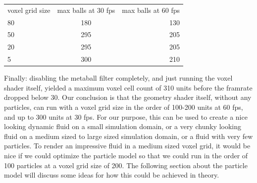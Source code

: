 \documentclass{article}
\begin{document}
\begin{multicols}{2}
        \begin{tabular}{ l | c | r }
            voxel grid size & max balls at 30 fps & max balls at 60 fps \\
            80 & 180 & 130 \\
            50 & 295 & 205 \\
            20 & 295 & 205 \\
            5 & 300 & 210 \\
        \end{tabular}

        Finally: disabling the metaball filter completely, and just running the voxel shader itself, yielded a maximum voxel cell count of 310 units before the framrate dropped below 30.
        Our conclusion is that the geometry shader itself, without any particles, can run with a voxel grid size in the order of 100-200 units at 60 fps, and up to 300 units at 30 fps.
        For our purpose, this can be used to create a nice looking dynamic fluid on a small simulation domain, or a very chunky looking fluid on a medium sized to large sized simulation domain, or a fluid with very few particles.
        To render an impressive fluid in a medium sized voxel grid, it would be nice if we could optimize the particle model so that we could run in the order of 100 particles at a voxel grid size of 200.
        The following section about the particle model will discuss some ideas for how this could be achieved in theory.


\end{multicols}
\end{document}

